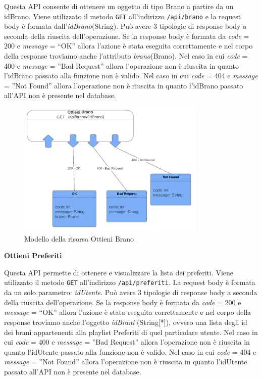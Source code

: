 \documentclass[a4paper,12pt]{article}
\begin{document}
Questa API consente di ottenere un oggetto di tipo Brano a partire da un idBrano. Viene utilizzato il metodo \texttt{GET} all’indirizzo \texttt{/api/brano} e la request body è formata dall’\textit{idBrano}(String). \newline
Può avere 3 tipologie di response body a seconda della riuscita dell’operazione. \newline
Se la response body è formata da \textit{code} = 200 e \textit{message} = “OK” allora l'azione è stata eseguita correttamente e nel corpo della response troviamo anche l’attributo \textit{brano}(Brano). \newline
Nel caso in cui \textit{code} = 400 e \textit{message} = ”Bad Request” allora l’operazione non è riuscita in quanto l’idBrano passato alla funzione non è valido. \newline
Nel caso in cui \textit{code} = 404  e \textit{message} = ”Not Found” allora l’operazione non è riuscita in quanto l’idBrano passato all’API non è presente nel database.

\begin{figure}[htp]
    \centering
    \includegraphics[width=0.8\textwidth]{resource-models/ottieni-brano.png}
    \caption{Modello della risorsa Ottieni Brano}
\end{figure}

\textbf{Ottieni Preferiti}

Questa API permette di ottenere e visualizzare la lista dei preferiti. Viene utilizzato il metodo \texttt{GET} all’indirizzo \texttt{/api/preferiti}. \newline
La request body è formata da un solo parametro: \textit{idUtente}. \newline
Può avere 3 tipologie di response body a seconda della riuscita dell’operazione. \newline
Se la response body è formata da \textit{code} = 200 e \textit{message} = “OK” allora l'azione è stata eseguita correttamente e nel corpo della response troviamo anche l’oggetto \textit{idBrani} (String[*]), ovvero una lista degli id dei brani appartenenti alla playlist Preferiti di quel particolare utente. \newline
Nel caso in cui \textit{code} = 400  e \textit{message} = ”Bad Request” allora l’operazione non è riuscita in quanto l’idUtente passato alla funzione non è valido. \newline
Nel caso in cui \textit{code} = 404  e \textit{message} = ”Not Found” allora l’operazione non è riuscita in quanto l’idUtente passato all’API non è presente nel database.
\end{document}
